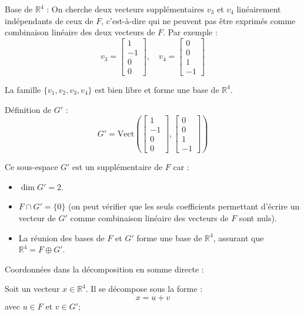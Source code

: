 \documentclass[10pt,a4paper]{article}
\begin{document}
Base de \( \mathbb{R}^4 \) : On cherche deux vecteurs supplémentaires \( v_3 \) et \( v_4 \)
linéairement indépendants de ceux de \( F \), c'est-à-dire qui ne peuvent pas être exprimés comme
combinaison linéaire des deux vecteurs de \( F \). Par exemple :
\[
v_3 = \begin{bmatrix} 1 \\ -1 \\ 0 \\ 0 \end{bmatrix}, \quad v_4 = \begin{bmatrix} 0 \\ 0 \\ 1 \\ -1 \end{bmatrix}
\]

La famille \( \{ v_1, v_2, v_3, v_4 \} \) est bien libre et forme une base de \( \mathbb{R}^4 \).

Définition de \( G' \) :
\[
G' = \text{Vect} \left( \begin{bmatrix} 1 \\ -1 \\ 0 \\ 0 \end{bmatrix}, \begin{bmatrix} 0 \\ 0 \\ 1 \\ -1 \end{bmatrix} \right)
\]

Ce sous-espace \( G' \) est un supplémentaire de \( F \) car :
\begin{itemize}
    \item \( \dim G' = 2 \).
    \item \( F \cap G' = \{0\} \) (on peut vérifier que les seuls coefficients permettant d'écrire
    un vecteur de \( G' \) comme combinaison linéaire des vecteurs de \( F \) sont nuls).
    \item La réunion des bases de \( F \) et \( G' \) forme une base de \( \mathbb{R}^4 \), assurant
    que \( \mathbb{R}^4 = F \oplus G' \).
\end{itemize}

\q Coordonnées dans la décomposition en somme directe :

Soit un vecteur \( x \in \mathbb{R}^4 \). Il se décompose sous la forme :
\[
x = u + v
\]
avec \( u \in F \) et \( v \in G' \);
\end{document}
